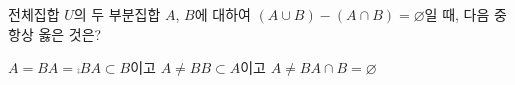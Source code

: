 전체집합 $U$의 두 부분집합 $A$, $B$에 대하여 $(A\cup B)-(A\cap B)=\varnothing$일 때, 다음 중 항상 옳은 것은?
\begin{choicesii}{$A=B$}{$A=\comp{B}$}{$A\subset B$이고 $A\ne B$}{$B\subset A$이고 $A\ne B$}{$A\cap B=\varnothing$}\end{choicesii}
